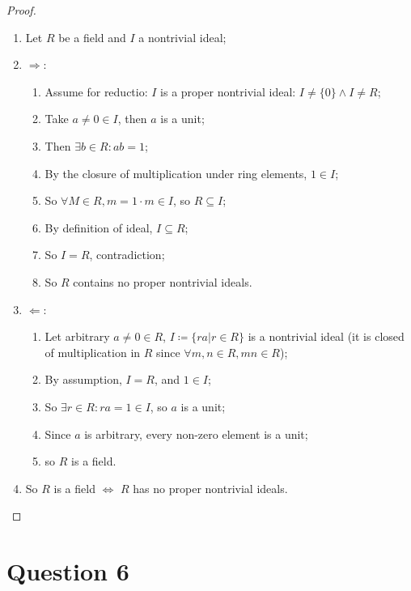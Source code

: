 \documentclass{article}
\begin{document}
\begin{proof}
    ~
    \begin{enumerate}
        \item Let $R$ be a field and $I$ a nontrivial ideal;
        \item $\Rightarrow$:
        \begin{enumerate}
            \item Assume for reductio: $I$ is a proper nontrivial ideal: $I \ne\{0\}\land I\ne R$;
            \item Take $a\ne0\in I$, then $a$ is a unit;
            \item Then $\exists b\in R: ab=1$;
            \item By the closure of multiplication under ring elements, $1\in I$;
            \item So $\forall M\in R, m=1\cdot m\in I$, so $R\subseteq I$;
            \item By definition of ideal, $I\subseteq R$;
            \item So $I=R$, contradiction;
            \item So $R$ contains no proper nontrivial ideals.
        \end{enumerate}
        \item $\Leftarrow$:
        \begin{enumerate}
            \item Let arbitrary $a\ne0\in R$, $I\coloneqq \{ra|r\in R\}$ is a nontrivial ideal (it is closed of multiplication in $R$ since $\forall m,n\in R,mn\in R$);
            \item By assumption, $I=R$, and $1\in I$;
            \item So $\exists r\in R: ra=1\in I$, so $a$ is a unit;
            \item Since $a$ is arbitrary, every non-zero element is a unit;
            \item so $R$ is a field.
        \end{enumerate}
        \item So $R$ is a field $\Leftrightarrow$ $R$ has no proper nontrivial ideals.
    \end{enumerate}
\end{proof}

\newpage

\section*{Question 6}
\end{document}
